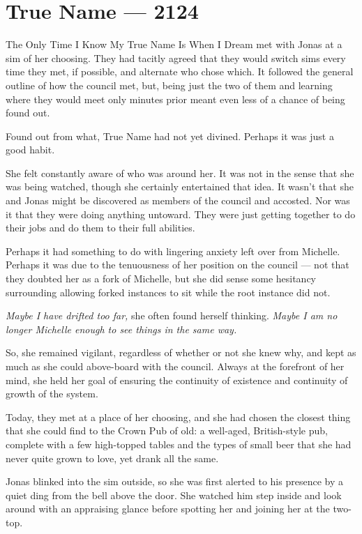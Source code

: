 \hypertarget{true-name-2124}{%
\chapter{True Name — 2124}\label{true-name-2124}}

The Only Time I Know My True Name Is When I Dream met with Jonas at a sim of her choosing. They had tacitly agreed that they would switch sims every time they met, if possible, and alternate who chose which. It followed the general outline of how the council met, but, being just the two of them and learning where they would meet only minutes prior meant even less of a chance of being found out.

Found out from what, True Name had not yet divined. Perhaps it was just a good habit.

She felt constantly aware of who was around her. It was not in the sense that she was being watched, though she certainly entertained that idea. It wasn't that she and Jonas might be discovered as members of the council and accosted. Nor was it that they were doing anything untoward. They were just getting together to do their jobs and do them to their full abilities.

Perhaps it had something to do with lingering anxiety left over from Michelle. Perhaps it was due to the tenuousness of her position on the council — not that they doubted her as a fork of Michelle, but she did sense some hesitancy surrounding allowing forked instances to sit while the root instance did not.

\emph{Maybe I have drifted too far,} she often found herself thinking. \emph{Maybe I am no longer Michelle enough to see things in the same way.}

So, she remained vigilant, regardless of whether or not she knew why, and kept as much as she could above-board with the council. Always at the forefront of her mind, she held her goal of ensuring the continuity of existence and continuity of growth of the system.

Today, they met at a place of her choosing, and she had chosen the closest thing that she could find to the Crown Pub of old: a well-aged, British-style pub, complete with a few high-topped tables and the types of small beer that she had never quite grown to love, yet drank all the same.

Jonas blinked into the sim outside, so she was first alerted to his presence by a quiet ding from the bell above the door. She watched him step inside and look around with an appraising glance before spotting her and joining her at the two-top.

